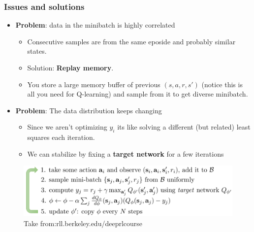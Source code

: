 \documentclass{beamer}
\renewcommand{\high}{\textbf}
\begin{document}
\begin{frame}\frametitle{Issues and solutions}\small
\begin{itemize}
    \item \high{Problem}: data in the minibatch is highly correlated
    \begin{itemize}
        \item Consecutive samples are from the same eposide and probably similar states.
        \item Solution: \high{Replay memory}.
        \item You store a large memory buffer of previous $(s,a,r,s')$ (notice this is all you need for Q-learning) and sample from it to get diverse minibatch.
    \end{itemize}
    \item \high{Problem}: The data distribution keeps changing
\begin{itemize}
    \item Since we aren't optimizing $y_i$ its like solving a different (but related) least squares each iteration.
    \item We can stabilize by fixing a \high{target network} for a few iterations 
\end{itemize}
\end{itemize}
    \begin{figure}
    \includegraphics[width=0.75\linewidth]{Figures/DQN}
    \vspace{-0.4cm}
    \caption{Take from:rll.berkeley.edu/deeprlcourse}
\end{figure}
\end{frame}
\end{document}
